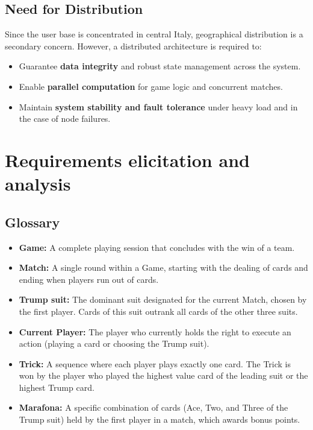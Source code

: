 \documentclass{scrartcl}
\begin{document}
\subsection*{Need for Distribution}
Since the user base is concentrated in central Italy, geographical distribution is a secondary concern. However, a distributed architecture is required to:
\begin{itemize}
    \item Guarantee \textbf{data integrity} and robust state management across the system.
    \item Enable \textbf{parallel computation} for game logic and concurrent matches.
    \item Maintain \textbf{system stability and fault tolerance} under heavy load and in the case of node failures.
\end{itemize}

\section{Requirements elicitation and analysis}\label{requirements}

\subsection*{Glossary}
\begin{itemize}
  \item \textbf{Game:} A complete playing session that concludes with the win of a team.
  \item \textbf{Match:} A single round within a Game, starting with the dealing of cards and ending when players run out of cards.
  \item \textbf{Trump suit:} The dominant suit designated for the current Match, chosen by the first player. Cards of this suit outrank all cards of the other three suits.
  \item \textbf{Current Player:} The player who currently holds the right to execute an action (playing a card or choosing the Trump suit).
  \item \textbf{Trick:} A sequence where each player plays exactly one card. The Trick is won by the player who played the highest value card of the leading suit or the highest Trump card.
  \item \textbf{Marafona:} A specific combination of cards (Ace, Two, and Three of the Trump suit) held by the first player in a match, which awards bonus points.
\end{itemize}
\end{document}
